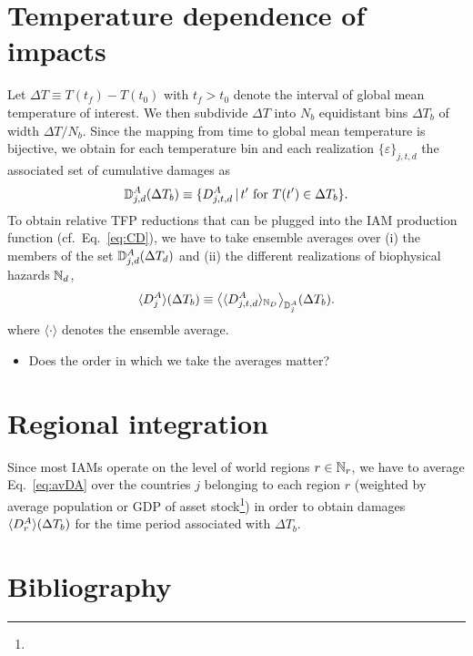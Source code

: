 \documentclass[preprint,3p,authoryear]{elsarticle}
\begin{document}
\section{Temperature dependence of impacts}
Let  $\Delta T\equiv T(t_f)-T(t_0)$ with $t_f>t_0$ denote the interval of global mean temperature of interest. We then subdivide $\Delta T$ into $N_b$ equidistant bins $\Delta T_b$ of width $\Delta T/N_b$. Since the mapping from time to global mean temperature is bijective, we obtain for each temperature bin and each realization $\lbrace \varepsilon\rbrace_{j,t,d}$ the associated set of cumulative damages as
\begin{equation}
  \label{eq:DDA}
  \mathbb{D}^A_{j,d}(\Delta T_b)\equiv\lbrace D^A_{j,t,d}\, \vert\, t' \text{ for } T(t')\in\Delta T_b \rbrace.
\end{equation}
To obtain relative TFP reductions that can be plugged into the IAM production function (cf.~Eq.~\eqref{eq:CD}), we have to take ensemble averages over (i) the members of the set $\mathbb{D}^A_{j,d}(\Delta T_d)$ and (ii) the different realizations of biophysical hazards $\mathbb{N}_d$,
\begin{equation}
  \label{eq:avDA}
  \langle D^A_{j}\rangle(\Delta T_b)\equiv\big\langle\langle D^A_{j,t,d}\rangle_{\mathbb{N}_D}\big\rangle_{\mathbb{D}^A_{j}}(\Delta T_b).
\end{equation}
where $\langle\cdot\rangle$ denotes the ensemble average.

\begin{itemize}
\item Does the order in which we take the averages matter?
\end{itemize}

\section{Regional integration}
\label{sec:regInt}
Since most IAMs operate on the level of world regions $r\in\mathbb{N}_r$, we have to average Eq.~\eqref{eq:avDA} over the countries $j$ belonging to each region $r$ (weighted by average population or GDP of asset stock\footnote{})  in order to obtain damages $\langle D^A_{r}\rangle(\Delta T_b)$ for the time period associated with $\Delta T_b$.



\section*{Bibliography}
%

\end{document}
